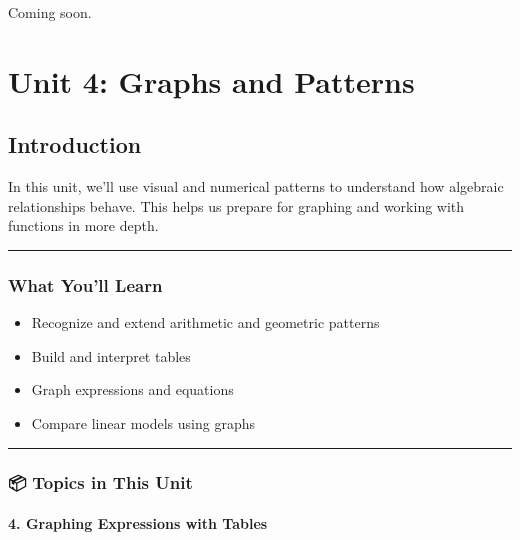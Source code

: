 \documentclass[
  letterpaper,
  DIV=11,
  numbers=noendperiod]{scrreprt}
\providecommand{\tightlist}{%
  \setlength{\itemsep}{0pt}\setlength{\parskip}{0pt}}
\begin{document}

Coming soon.

\part{Unit 4: Graphs and Patterns}

\chapter*{Introduction}\label{introduction-3}


In this unit, we'll use visual and numerical patterns to understand how
algebraic relationships behave. This helps us prepare for graphing and
working with functions in more depth.

\begin{center}\rule{0.5\linewidth}{0.5pt}\end{center}

\section*{What You'll Learn}\label{what-youll-learn-3}


\begin{itemize}
\tightlist
\item
  Recognize and extend arithmetic and geometric patterns
\item
  Build and interpret tables
\item
  Graph expressions and equations
\item
  Compare linear models using graphs
\end{itemize}

\begin{center}\rule{0.5\linewidth}{0.5pt}\end{center}

\section*{📦 Topics in This Unit}\label{topics-in-this-unit-3}


\subsection*{4. Graphing Expressions with
Tables}\label{graphing-expressions-with-tables}
\end{document}
